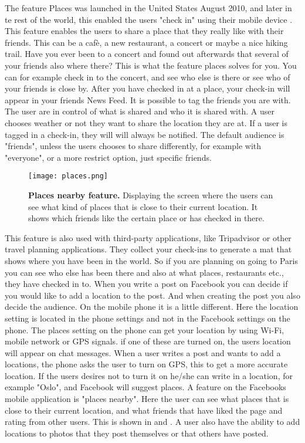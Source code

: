 The feature Places was launched in the United States August 2010, and later in te rest of the world, this enabled the users "check in" using their mobile device \cite{checkIn}. This feature enables the users to share a place that they really like with their friends. This can be a cafè, a new restaurant, a concert or maybe a nice hiking trail. Have you ever been to a concert and found out afterwards that several of your friends also where there? This is what the feature places solves for you. You can for example check in to the concert, and see who else is there or see who of your friends is close by. After you have checked in at a place, your check-in will appear in your friends News Feed. It is possible to tag the friends you are with. The user are in control of what is shared and who it is shared with. A user chooses weather or not they want to share the location they are at. If a user is tagged in a check-in, they will will always be notified. The default audience is "friends", unless the users chooses to share differently, for example with "everyone", or a more restrict option, just specific friends. 

\begin{figure}[t]
\centering
\texttt{[image: places.png]}
\caption [Places nearby feature]{\textbf{Places nearby feature.} Displaying the screen where the users can see what kind of places that is close to their current location. It shows which friends like the certain place or has checked in there.} 
\label{fig:places}
\end{figure}

This feature is also used with third-party applications, like Tripadvisor or other travel planning applications. They collect your check-ins to generate a mat that shows where you have been in the world. So if you are planning on going to Paris you can see who else has been there and also at what places, restaurants etc., they have checked in to. 
When you write a post on Facebook you can decide if you would like to add a location to the post. And when creating the post you also decide the audience. On the mobile phone it is a little different. Here the location setting is located in the phone settings and not in the Facebook settings on the phone. The places setting on the phone can get your location by using Wi-Fi, mobile network or GPS signals. if one of these are turned on, the users location will appear on chat messages. When a user writes a post and wants to add a locations, the phone asks the user to turn on GPS, this to get a more accurate location. If the users desires not to turn it on he/she can write in a location, for example "Oslo", and Facebook will suggest places. A feature on the Facebooks mobile application is "places nearby". Here the user can see what places that is close to their current location, and what friends that have liked the page and rating from other users. This is shown in  and . A user also have the ability to add locations to photos that they post themselves or that others have posted. 


